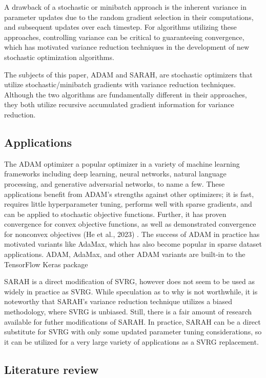 \documentclass[letterpaper,11 pt]{article}
\begin{document}
A drawback of a stochastic or minibatch approach is the inherent variance in parameter updates due to the random gradient selection in their computations, and subsequent updates over each timestep.  For algorithms utilizing these approaches, controlling variance can be critical to guaranteeing convergence, which has motivated variance reduction techniques in the development of new stochastic optimization algorithms.

The subjects of this paper, ADAM and SARAH, are stochastic optimizers that utilize stochastic/minibatch gradients with variance reduction techniques.  Although the two algorithms are fundamentally different in their approaches, they both utilize recursive accumulated gradient information for variance reduction.  


\subsection{Applications} 
The ADAM optimizer a popular optimizer in a variety of machine learning frameworks including deep learning, neural networks, natural language processing, and generative adversarial networks, to name a few.  These applications benefit from ADAM’s strengths against other optimizers; it is fast, requires little hyperparameter tuning, performs well with sparse gradients, and can be applied to stochastic objective functions.  Further, it has proven convergence for convex objective functions, as well as demonstrated convergence for nonconvex objectives (He et al., 2023) \cite{heconvergence}.  The success of ADAM in practice has motivated variants like AdaMax, which has also become popular in sparse dataset applications.  ADAM, AdaMax, and other ADAM variants are built-in to the TensorFlow Keras package \cite{tensorflow}

SARAH is a direct modification of SVRG, however does not seem to be used as widely in practice as SVRG.  While speculation as to why is not worthwhile, it is noteworthy that SARAH’s variance reduction technique utilizes a biased methodology, where SVRG is unbiased.  Still, there is a fair amount of research available for futher modifications of SARAH.  In practice, SARAH can be a direct substitute for SVRG with only some updated parameter tuning considerations, so it can be utilized for a very large variety of applications as a SVRG replacement.

\subsection{ Literature review}
\end{document}
